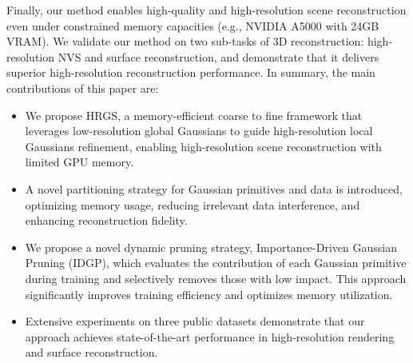 




Finally, our method enables high-quality and high-resolution scene reconstruction even under constrained memory capacities (e.g., NVIDIA A5000 with 24GB VRAM).
We validate our method on two sub-tasks of 3D reconstruction: high-resolution NVS and surface reconstruction, and demonstrate that it delivers superior high-resolution reconstruction performance. In summary, the main contributions of this paper are:

\begin{itemize}[leftmargin=*]
    \item We propose HRGS, a memory-efficient coarse to fine framework that leverages low-resolution global Gaussians to guide high-resolution local Gaussians refinement, enabling high-resolution scene reconstruction with limited GPU memory.
    
    \item A novel partitioning strategy for Gaussian primitives and data is introduced, optimizing memory usage, reducing irrelevant data interference, and enhancing reconstruction fidelity.
    
     \item We propose a novel dynamic pruning strategy, Importance-Driven Gaussian Pruning (IDGP), which evaluates the contribution of each Gaussian primitive during training and selectively removes those with low impact. This approach significantly improves training efficiency and optimizes memory utilization.

    \item Extensive experiments on three public datasets demonstrate that our approach achieves state-of-the-art performance in high-resolution rendering and surface reconstruction.
\end{itemize}




